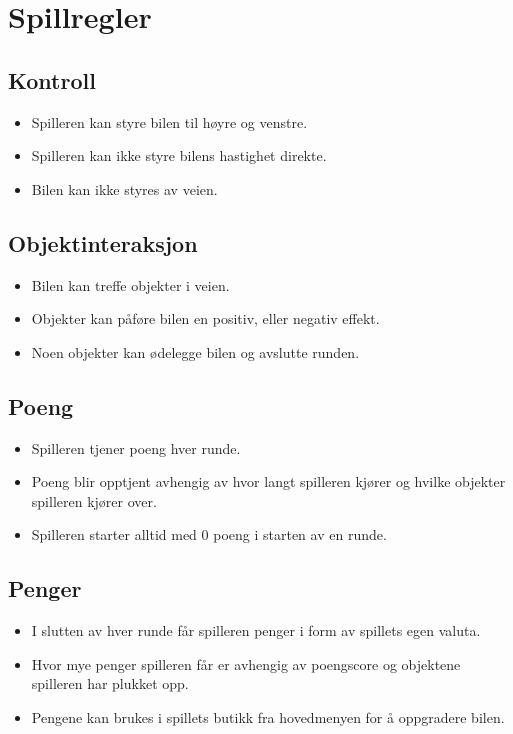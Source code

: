 \documentclass[paper=a4]{article}
\begin{document}
	\section{Spillregler}
		\subsection{Kontroll}
		\begin{itemize}
			\item{Spilleren kan styre bilen til høyre og venstre.}
			\item{Spilleren kan ikke styre bilens hastighet direkte.}
			\item{Bilen kan ikke styres av veien.}
		\end{itemize}

		\subsection{Objektinteraksjon}
		\begin{itemize}
			\item{Bilen kan treffe objekter i veien.}
			\item{Objekter kan påføre bilen en positiv, eller negativ effekt.}
			\item{Noen objekter kan ødelegge bilen og avslutte runden.}
		\end{itemize}

		\subsection{Poeng}
		\begin{itemize}
			\item{Spilleren tjener poeng hver runde.}
			\item{Poeng blir opptjent avhengig av hvor langt spilleren kjører og hvilke objekter spilleren kjører over.}
			\item{Spilleren starter alltid med 0 poeng i starten av en runde.}
		\end{itemize}

		\subsection{Penger}
		\begin{itemize}
			\item{I slutten av hver runde får spilleren penger i form av spillets egen valuta.}
			\item{Hvor mye penger spilleren får er avhengig av poengscore og objektene spilleren har plukket opp.}
			\item{Pengene kan brukes i spillets butikk fra hovedmenyen for å oppgradere bilen.}
		\end{itemize}
\end{document}
